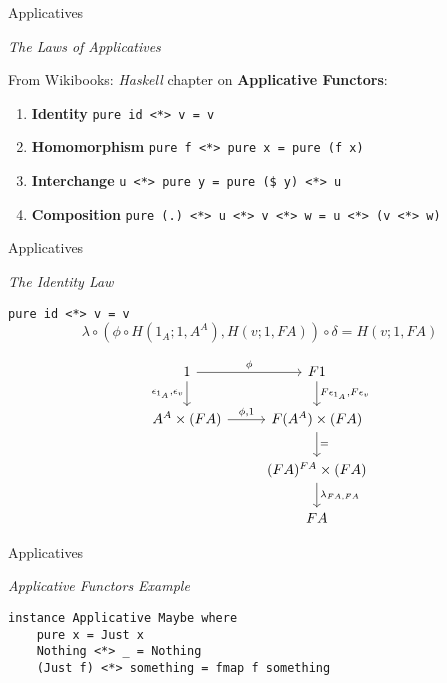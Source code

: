 \documentclass[10pt]{beamer}
\newcommand{\Com}[3]{#3^{#2}}
\newcommand{\strong}[1]{\textbf{#1}}
\theoremstyle{definition}
\theoremstyle{remark}
\numberwithin{equation}{section}
\begin{document}
\begin{frame}[fragile]{Applicatives}

  \emph{The Laws of Applicatives}

  From Wikibooks: \emph{Haskell} chapter on \strong{Applicative Functors}:
  
  \begin{enumerate}
  \item \strong{Identity}     \lstinline{pure id <*> v = v}
  \item \strong{Homomorphism} \lstinline{pure f <*> pure x = pure (f x)}
  \item \strong{Interchange}  \lstinline{u <*> pure y = pure ($ y) <*> u}
  \item \strong{Composition}  \lstinline{pure (.) <*> u <*> v <*> w = u <*> (v <*> w)}
  \end{enumerate}

\end{frame}

\begin{frame}[fragile]{Applicatives}

  \emph{The Identity Law}

  \lstinline{pure id <*> v = v}
  \[
  \lambda \circ (\phi \circ H(1_A;1,A^A),H(v;1,F A)) \circ \delta = H(v;1,F A)
  \]

  \[
  \begin{tikzcd}
    1 \arrow{r}{\phi}\arrow{d}[swap]{\epsilon_{1_A},\epsilon_v} & F 1 \arrow{d}{F \epsilon_{1_A},F \epsilon_v} \\
    \Com{C}{A}{A}\times (F A) \arrow{r}{\phi,1} & F (\Com{C}{A}{A}) \times (F A) \arrow{d}{=} \\
    & \Com{C}{F A}{(F A)} \times (F A) \arrow{d}{\lambda_{FA,FA}} \\
    & F A
  \end{tikzcd}
  \]

\end{frame}

\begin{frame}[fragile]{Applicatives}

  \emph{Applicative Functors Example}

  \begin{lstlisting}[frame=single]
instance Applicative Maybe where
    pure x = Just x
    Nothing <*> _ = Nothing
    (Just f) <*> something = fmap f something
  \end{lstlisting}

\end{frame}
\end{document}
